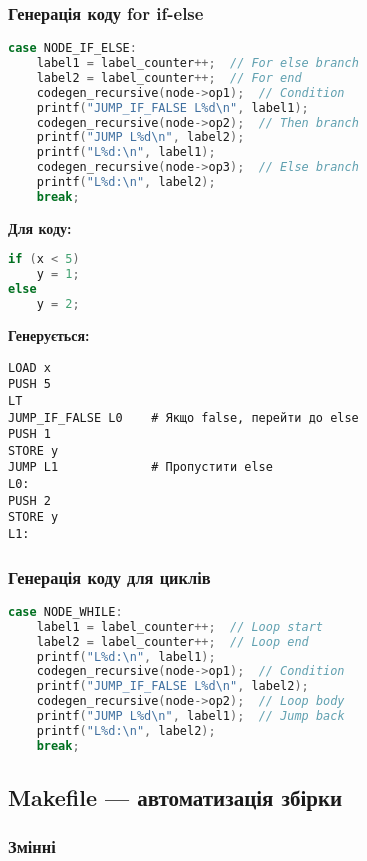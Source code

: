 \documentclass[12pt,a4paper]{article}
\begin{document}
\subsubsection{Генерація коду for if-else}

\begin{lstlisting}[language=C]
case NODE_IF_ELSE:
    label1 = label_counter++;  // For else branch
    label2 = label_counter++;  // For end
    codegen_recursive(node->op1);  // Condition
    printf("JUMP_IF_FALSE L%d\n", label1);
    codegen_recursive(node->op2);  // Then branch
    printf("JUMP L%d\n", label2);
    printf("L%d:\n", label1);
    codegen_recursive(node->op3);  // Else branch
    printf("L%d:\n", label2);
    break;
\end{lstlisting}

\textbf{Для коду:}
\begin{lstlisting}[language=C]
if (x < 5) 
    y = 1; 
else 
    y = 2;
\end{lstlisting}

\textbf{Генерується:}
\begin{verbatim}
LOAD x
PUSH 5
LT
JUMP_IF_FALSE L0    # Якщо false, перейти до else
PUSH 1
STORE y
JUMP L1             # Пропустити else
L0:
PUSH 2
STORE y
L1:
\end{verbatim}

\subsubsection{Генерація коду для циклів}

\begin{lstlisting}[language=C]
case NODE_WHILE:
    label1 = label_counter++;  // Loop start
    label2 = label_counter++;  // Loop end
    printf("L%d:\n", label1);
    codegen_recursive(node->op1);  // Condition
    printf("JUMP_IF_FALSE L%d\n", label2);
    codegen_recursive(node->op2);  // Loop body
    printf("JUMP L%d\n", label1);  // Jump back
    printf("L%d:\n", label2);
    break;
\end{lstlisting}

\subsection{Makefile --- автоматизація збірки}

\subsubsection{Змінні}
\end{document}
